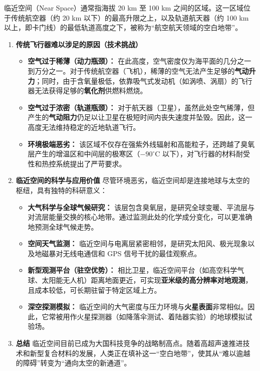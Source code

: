 \documentclass[12pt,a4paper]{article}
\begin{document}
	临近空间（Near Space）通常指海拔 20 km 至 100 km 之间的区域。这一区域位于传统航空器（约 20 km 以下）的最高升限之上，以及轨道航天器（约 100 km 以上，即卡门线）的最低轨道高度之下，被称为“航空航天领域的空白地带”。
	
	\begin{enumerate}
		\item \textbf{传统飞行器难以涉足的原因（技术挑战）}
		\begin{itemize}
			\item \textbf{空气过于稀薄（动力瓶颈）：} 
			在此高度，空气密度仅为海平面的几分之一到万分之一。对于传统航空器（飞机），稀薄的空气无法产生足够的\textbf{气动升力}；同时，由于含氧量极低，依靠吸气式发动机（如涡喷、涡扇）的飞行器无法获得足够的\textbf{氧化剂}供燃料燃烧。
			\item \textbf{空气过于浓密（轨道瓶颈）：} 
			对于航天器（卫星），虽然此处空气稀薄，但产生的\textbf{气动阻力}仍足以让卫星在极短时间内丧失速度并坠毁。因此，这一高度无法维持稳定的近地轨道飞行。
			\item \textbf{环境极端恶劣：} 
			该区域不仅存在强紫外线辐射和高能粒子，还跨越了臭氧层产生的增温区和中间层的极寒区（$-90^{\circ}\text{C}$ 以下），对飞行器的材料耐受性和热控系统提出了严苛要求。
		\end{itemize}
		
		\item \textbf{临近空间的科学与应用价值}
		尽管环境恶劣，临近空间却是连接地球与太空的枢纽，具有独特的科研意义：
		\begin{itemize}
			\item \textbf{大气科学与全球气候研究：} 
			该层包含臭氧层，是研究全球变暖、平流层与对流层能量交换的核心地带。通过监测此处的化学成分变化，可以更准确地预测全球气候走势。
			\item \textbf{空间天气监测：} 
			临近空间与电离层紧密相邻，是研究太阳风、极光现象以及地磁暴对无线电通信和 GPS 信号干扰的最佳观察点。
			\item \textbf{新型观测平台（驻空优势）：} 
			相比卫星，临近空间平台（如高空科学气球、太阳能无人机）距离地面更近，可实现\textbf{亚米级的高分辨率对地观测}，且成本较低，可长期驻留于特定区域上方。
			\item \textbf{深空探测模拟：} 
			临近空间的大气密度与压力环境与\textbf{火星表面}非常相似。因此，它常被用作火星探测器（如降落伞测试、着陆器实验）的地球模拟试验场。
		\end{itemize}
		
		\item \textbf{总结}
		临近空间目前已成为大国科技竞争的战略制高点。随着高超声速推进技术和新型复合材料的发展，人类正在填补这一“空白地带”，使其从“难以逾越的障碍”转变为“通向太空的新通道”。
	\end{enumerate}
\end{document}
